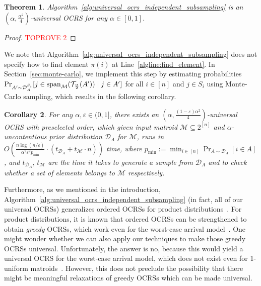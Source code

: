 \documentclass[11pt]{article}
\newcommand{\D}{\mathcal D}
\newcommand{\M}{{\mathcal M}}
\newcommand{\T}{{\mathcal T}}
\newcommand{\eps}{\varepsilon}
\newcommand{\spa}{\textnormal{span}}
\newtheorem{theorem}{Theorem}[section]
\newtheorem{corollary}[theorem]{Corollary}
\begin{document}
\begin{theorem}\label{thm:universal_ocrs_independent_subsampling}
Algorithm~\ref{alg:universal_ocrs_independent_subsampling} is an $(\alpha,\frac{\alpha^2}{4})$-universal OCRS for any $\alpha\in[0,1]$.
\end{theorem}
\begin{proof}\textcolor{red}{TOPROVE 2}\end{proof}

We note that Algorithm~\ref{alg:universal_ocrs_independent_subsampling} does not specify how to find element $\pi(i)$ at Line~\ref{algline:find_element}. In Section~\ref{sec:monte-carlo}, we implement this step by estimating probabilities ${\Pr}_{A'\sim \D_A^{S_i}}[j\in \spa_{\M}(\T_{\frac{\alpha}{2}}(A'))\mid j\in A']$ for all $i\in[n]$ and $j\in S_i$ using Monte-Carlo sampling, which results in the following corollary.
\begin{corollary}\label{cor:explicit_universal_OCRS}
For any $\alpha,\eps\in(0,1]$, there exists an $(\alpha,\frac{(1-\eps)\alpha^2}{4})$-universal OCRS with preselected order, which given input matroid $\M\subseteq2^{[n]}$ and $\alpha$-uncontentious prior distribution $\D_A$ for $\M$, runs in $O\left(\frac{n\log(n/\eps)}{\alpha^2\eps^2 p_{\min}}\cdot (t_{\D_A}+t_{\M}\cdot n)\right)$ time, where $p_{\min}:=\min_{i\in[n]}\Pr_{A\sim\D_A}[i\in A]$, and $t_{\D_A},\,t_{\M}$ are the time it takes to generate a sample from $\D_A$ and to check whether a set of elements belongs to $\M$ respectively.
\end{corollary}

Furthermore, as we mentioned in the introduction, Algorithm~\ref{alg:universal_ocrs_independent_subsampling} (in fact, all of our universal OCRSs) generalizes ordered OCRSs for product distributions~\citep{chekuri2014submodular,gupta2013stochastic}. For product distributions, it is known that ordered OCRSs can be strengthened to obtain \emph{greedy} OCRSs, which work even for the worst-case arrival model~\citep[Theorem 2.1]{feldman2021online}. One might wonder whether we can also apply our techniques to make those greedy OCRSs universal. Unfortunately, the answer is no, because this would yield a universal OCRS for the worst-case arrival model, which does not exist even for 1-uniform matroids~\citep[Theorem 5.7]{dughmi2020outer}. However, this does not preclude the possibility that there might be meaningful relaxations of greedy OCRSs which can be made universal. 
\end{document}
